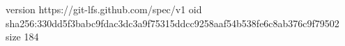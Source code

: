 version https://git-lfs.github.com/spec/v1
oid sha256:330dd5f3babc9fdac3dc3a9f75315ddcc9258aaf54b538fe6c8ab376c9f79502
size 184
